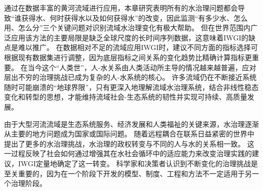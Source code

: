 通过在数据丰富的黄河流域进行应用，本章研究表明所有的水治理问题都会导致“谁获得水、何时获得水以及如何获得水”的改变，因此监测“有多少水、怎么用、怎么分”三个关键问题对识别流域水治理变化有极大帮助。
但在世界范围内广泛应用该方法的主要局限是缺乏全球尺度的长时间序列数据，这意味着IWGI的缺点是难以推广。
在数据相对不足的流域应用IWGI时，建议不同方面的指标选择可根据现有数据集进行调整，因为底层指标之间关系的变化趋势比精确计算指标更重要。
在当今这个“人类世”，人-水关系由人类活动所主导的情况越来越普遍，应对层出不穷的治理挑战已成为复杂的人-水系统的核心\cite{cumming2018,cumming2014,jaeger2019}。
许多流域仍在不断接近系统随时可能崩溃的“地球界限”\cite{gleeson2020, wang-erlandsson2022}，只有更深入地理解流域水治理系统，结合非线性稳态变化和转型的思想，才能维持流域社会-生态系统的韧性并实现可持续、高质量发展\cite{falkenmark2019}。

由于大型河流流域是生态系统服务、经济发展和人类福祉的关键来源，水治理逐渐从主要的地方问题成为国家或国际问题\cite{best2019,best2020}。
随着远程耦合在联系日益紧密的世界中提出了更多的水治理挑战，水治理的政权转变与不同的人与水的关系相一致\cite{diaz2019}。
这一过程反映了社会如何通过增强其在水社会循环中的适应能力来改变治理实践的建议，IWGI定量地确定了这一转变\cite{loch2020,turton1999}。
科学家和决策者认识到不断变化的治理挑战是至关重要的，因为在一个阶段下开发的模型、制度、工程和方法不一定适用于另一个治理阶段\cite{reyers2018}。

